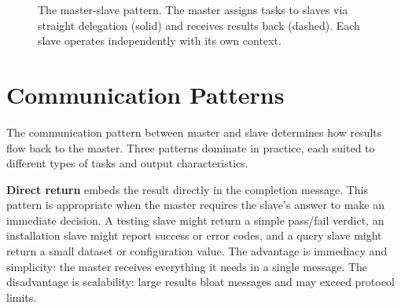 \begin{figure}[t]
\centering
{}
\caption{The master-slave pattern. The master assigns tasks to slaves via straight delegation (solid) and receives results back (dashed). Each slave operates independently with its own context.}
\label{fig:orchestrator_workers}
\end{figure}

\section{Communication Patterns}\label{sec:comm}

The communication pattern between master and slave determines how results flow back to the master. Three patterns dominate in practice, each suited to different types of tasks and output characteristics.

\textbf{Direct return} embeds the result directly in the completion message. This pattern is appropriate when the master requires the slave's answer to make an immediate decision. A testing slave might return a simple pass/fail verdict, an installation slave might report success or error codes, and a query slave might return a small dataset or configuration value. The advantage is immediacy and simplicity: the master receives everything it needs in a single message. The disadvantage is scalability: large results bloat messages and may exceed protocol limits.

